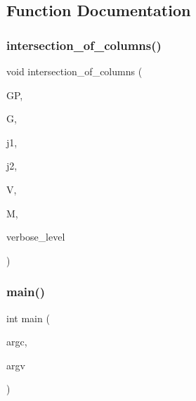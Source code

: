 \subsection{Function Documentation}
\mbox{\label{tdo__print_8_c_aace44bb8f2d51d1426d16a7023cc2aed}} 
\subsubsection{\texorpdfstring{intersection\+\_\+of\+\_\+columns()}{intersection\_of\_columns()}}
{\footnotesize\ttfamily void intersection\+\_\+of\+\_\+columns (\begin{DoxyParamCaption}\item[{\mbox{\hyperlink{classgeo__parameter}{geo\+\_\+parameter}} \&}]{GP,  }\item[{\mbox{\hyperlink{classtdo__scheme}{tdo\+\_\+scheme}} \&}]{G,  }\item[{\mbox{\hyperlink{galois_8h_a09fddde158a3a20bd2dcadb609de11dc}{I\+NT}}}]{j1,  }\item[{\mbox{\hyperlink{galois_8h_a09fddde158a3a20bd2dcadb609de11dc}{I\+NT}}}]{j2,  }\item[{\mbox{\hyperlink{class_vector}{Vector}} \&}]{V,  }\item[{\mbox{\hyperlink{class_vector}{Vector}} \&}]{M,  }\item[{\mbox{\hyperlink{galois_8h_a09fddde158a3a20bd2dcadb609de11dc}{I\+NT}}}]{verbose\+\_\+level }\end{DoxyParamCaption})}

\mbox{\label{tdo__print_8_c_a3c04138a5bfe5d72780bb7e82a18e627}} 
\subsubsection{\texorpdfstring{main()}{main()}}
{\footnotesize\ttfamily int main (\begin{DoxyParamCaption}\item[{int}]{argc,  }\item[{char $\ast$$\ast$}]{argv }\end{DoxyParamCaption})}

